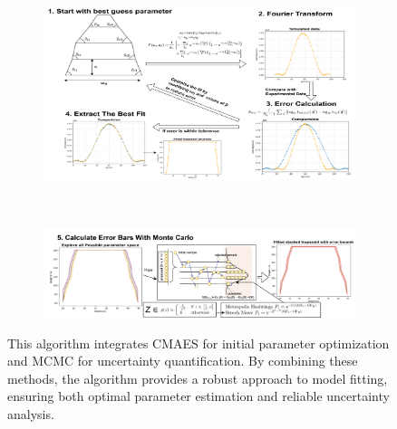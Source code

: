 \begin{figure}[h]
    \centering
    \begin{subfigure}[b]{1\textwidth}
        \centering
        \includegraphics[width=\textwidth]{images/cmaes_overall.png}
    \end{subfigure}
    \\
    \begin{subfigure}[b]{1\textwidth}
        \centering
        \includegraphics[width=\textwidth]{images/mcmc_overall.png}
    \end{subfigure}
    \caption{This algorithm integrates CMAES for initial parameter optimization and MCMC for uncertainty quantification. By combining these methods, the algorithm provides a robust approach to model fitting, ensuring both optimal parameter estimation and reliable uncertainty analysis.}
    \label{fig:cd_saxs_algo}
\end{figure}

\FloatBarrier


